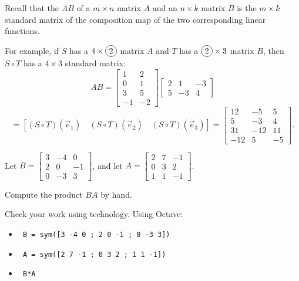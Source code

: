 \begin{applicationActivities}

\begin{remark}
Recall that the  \(AB\) of a 
\(m \times n\) matrix \(A\) and an \(n \times k\)
matrix \(B\) is the \(m \times k\) 
standard matrix of the composition map of the
two corresponding linear functions.

\vspace{1em}

For example, if \(S\) has a 
\(4\times \circledNumber{2}\) matrix \(A\) and
\(T\) has a \(\circledNumber{2}\times 3\) matrix 
\(B\), then \(S\circ T\) has a
\(4\times 3\) standard matrix:
\[
  AB
    =
  \begin{bmatrix} 1 & 2 \\ 0 & 1 \\ 3 & 5 \\ -1 & -2 \end{bmatrix}
  \begin{bmatrix} 2 & 1 & -3 \\ 5 & -3 & 4 \end{bmatrix}
\]
\[
    =
  \left[
  (S \circ T)(\vec{e}_1) \hspace{1em}
  (S\circ T)(\vec{e}_2) \hspace{1em}
  (S \circ T)(\vec{e}_3)
  \right]
    =
  \begin{bmatrix}
    12 & -5 & 5 \\
    5 & -3 & 4 \\
    31 & -12 & 11 \\
    -12 & 5 & -5
  \end{bmatrix}
.\]
\end{remark}






\begin{activity}{15}
Let \(B=\begin{bmatrix} 3 & -4 & 0 \\ 2 & 0 & -1 \\ 0 & -3 & 3 \end{bmatrix}\), 
and let \(A=\begin{bmatrix} 2 & 7 & -1 \\ 0 & 3 & 2 \\ 1 & 1 & -1 \end{bmatrix}\).  
\begin{subactivity}
  Compute the product \(BA\) by hand.
\end{subactivity}
\begin{subactivity}
  Check your work using technology. Using Octave:
  \begin{itemize}
    \item \texttt{ B = sym([3 -4 0 ; 2 0 -1 ; 0 -3 3]) }
    \item \texttt{ A = sym([2 7 -1 ; 0 3 2  ; 1 1 -1]) }
    \item \texttt{ B*A }
  \end{itemize}
\end{subactivity}
\end{activity}


\end{applicationActivities}
